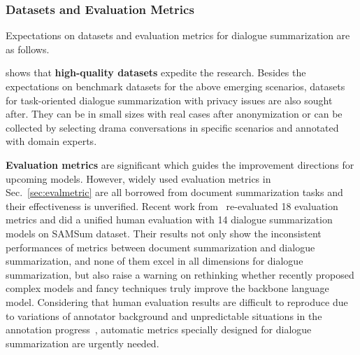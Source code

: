 \subsubsection{Datasets and Evaluation Metrics}
Expectations on datasets and evaluation metrics for dialogue summarization are as follows.

 shows that \textbf{high-quality datasets} 
expedite the research. Besides the expectations on benchmark datasets for the above emerging scenarios, datasets for task-oriented dialogue summarization 
with privacy issues are also sought after. They can be in small sizes with 
real cases after anonymization or can be collected by selecting 
drama conversations in specific scenarios and annotated with 
domain experts. 

\textbf{Evaluation metrics} are significant which guides the improvement directions for upcoming models. However, 
widely used evaluation metrics in Sec.~\ref{sec:evalmetric} are all borrowed from document summarization 
tasks and their effectiveness is unverified.
Recent work from~\citet{gao2022dialsummeval} re-evaluated 18 evaluation metrics and did a unified human evaluation with 14 dialogue summarization models on SAMSum dataset. 
Their results not only show the inconsistent performances of metrics between document summarization and dialogue summarization, and none of them excel in all dimensions for dialogue summarization, but also raise a warning on rethinking whether recently proposed complex models and fancy techniques truly improve the backbone language model.
Considering that human evaluation results are difficult to reproduce due to variations of annotator background and unpredictable situations in the annotation progress~\cite{clark2021all},
automatic metrics specially designed for dialogue summarization are urgently needed.


